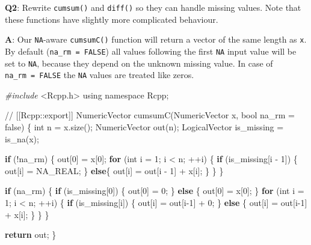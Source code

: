 \documentclass[
]{krantz}
\makeatletter
\newenvironment{Shaded}{\begin{snugshade}}{\end{snugshade}}
\newcommand{\CommentTok}[1]{\textcolor[rgb]{0.56,0.35,0.01}{\textit{#1}}}
\newcommand{\ControlFlowTok}[1]{\textcolor[rgb]{0.13,0.29,0.53}{\textbf{#1}}}
\newcommand{\DataTypeTok}[1]{\textcolor[rgb]{0.13,0.29,0.53}{#1}}
\newcommand{\DecValTok}[1]{\textcolor[rgb]{0.00,0.00,0.81}{#1}}
\newcommand{\ImportTok}[1]{#1}
\newcommand{\KeywordTok}[1]{\textcolor[rgb]{0.13,0.29,0.53}{\textbf{#1}}}
\newcommand{\NormalTok}[1]{#1}
\newcommand{\PreprocessorTok}[1]{\textcolor[rgb]{0.56,0.35,0.01}{\textit{#1}}}
\newenvironment{kframe}{%
\medskip{}
\setlength{\fboxsep}{.8em}
 \def\at@end@of@kframe{}%
 \ifinner\ifhmode%
  \def\at@end@of@kframe{\end{minipage}}%
  \begin{minipage}{\columnwidth}%
 \fi\fi%
 \def\FrameCommand##1{\hskip\@totalleftmargin \hskip-\fboxsep
 \colorbox{shadecolor}{##1}\hskip-\fboxsep
     \hskip-\linewidth \hskip-\@totalleftmargin \hskip\columnwidth}%
 \MakeFramed {\advance\hsize-\width
   \@totalleftmargin\z@ \linewidth\hsize
   \@setminipage}}%
 {\par\unskip\endMakeFramed%
 \at@end@of@kframe}
\renewenvironment{Shaded}{\begin{kframe}}{\end{kframe}}
\renewcommand{\KeywordTok} [1]{\textcolor[rgb]{0.00,0.44,0.13}{{#1}}}
\renewcommand{\DataTypeTok}[1]{\textcolor[rgb]{0.56,0.13,0.00}{{#1}}}
\renewcommand{\DecValTok}  [1]{\textcolor[rgb]{0.25,0.63,0.44}{{#1}}}
\renewcommand{\CommentTok} [1]{\textcolor[rgb]{0.38,0.63,0.69}{{#1}}}
\renewcommand{\NormalTok}  [1]{{#1}}
\makeatother
\begin{document}
\textbf{{Q2}}: Rewrite \texttt{cumsum()} and \texttt{diff()} so they can handle missing values. Note that these functions have slightly more complicated behaviour.

\textbf{{A}}: Our \texttt{NA}-aware \texttt{cumsumC()} function will return a vector of the same length as \texttt{x}. By default (\texttt{na\_rm\ =\ FALSE}) all values following the first \texttt{NA} input value will be set to \texttt{NA}, because they depend on the unknown missing value. In case of \texttt{na\_rm\ =\ FALSE} the \texttt{NA} values are treated like zeros.

\begin{Shaded}
\begin{Highlighting}[]
\PreprocessorTok{#include }\ImportTok{<Rcpp.h>}
\KeywordTok{using} \KeywordTok{namespace}\NormalTok{ Rcpp;}

\CommentTok{// [[Rcpp::export]]}
\NormalTok{NumericVector cumsumC(NumericVector x, }\DataTypeTok{bool}\NormalTok{ na_rm = }\KeywordTok{false}\NormalTok{) \{}
  \DataTypeTok{int}\NormalTok{ n = x.size();}
\NormalTok{  NumericVector out(n);}
\NormalTok{  LogicalVector is_missing = is_na(x);}
  
  \ControlFlowTok{if}\NormalTok{ (!na_rm) \{}
\NormalTok{    out[}\DecValTok{0}\NormalTok{] = x[}\DecValTok{0}\NormalTok{];}
    \ControlFlowTok{for}\NormalTok{ (}\DataTypeTok{int}\NormalTok{ i = }\DecValTok{1}\NormalTok{; i < n; ++i) \{}
      \ControlFlowTok{if}\NormalTok{ (is_missing[i - }\DecValTok{1}\NormalTok{]) \{}
\NormalTok{        out[i] = NA_REAL;}
\NormalTok{      \} }\ControlFlowTok{else}\NormalTok{\{}
\NormalTok{        out[i] = out[i - }\DecValTok{1}\NormalTok{] + x[i];}
\NormalTok{      \}}
\NormalTok{    \}}
\NormalTok{  \}}
  
  \ControlFlowTok{if}\NormalTok{ (na_rm) \{}
    \ControlFlowTok{if}\NormalTok{ (is_missing[}\DecValTok{0}\NormalTok{]) \{}
\NormalTok{      out[}\DecValTok{0}\NormalTok{] = }\DecValTok{0}\NormalTok{;}
\NormalTok{    \} }\ControlFlowTok{else}\NormalTok{ \{}
\NormalTok{      out[}\DecValTok{0}\NormalTok{] = x[}\DecValTok{0}\NormalTok{];}
\NormalTok{    \} }
    \ControlFlowTok{for}\NormalTok{ (}\DataTypeTok{int}\NormalTok{ i = }\DecValTok{1}\NormalTok{; i < n; ++i) \{}
      \ControlFlowTok{if}\NormalTok{ (is_missing[i]) \{}
\NormalTok{        out[i] = out[i-}\DecValTok{1}\NormalTok{] + }\DecValTok{0}\NormalTok{;}
\NormalTok{      \} }\ControlFlowTok{else}\NormalTok{ \{}
\NormalTok{        out[i] = out[i-}\DecValTok{1}\NormalTok{] + x[i];}
\NormalTok{      \} }
\NormalTok{    \}}
\NormalTok{  \}}
  
  \ControlFlowTok{return}\NormalTok{ out;}
\NormalTok{\}}
\end{Highlighting}
\end{Shaded}
\end{document}
